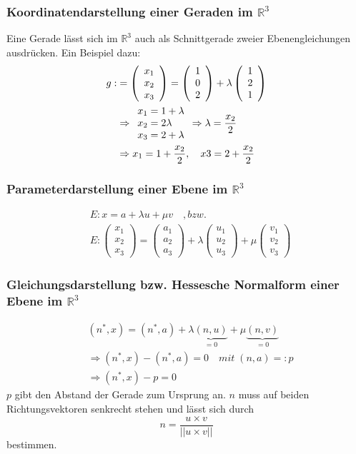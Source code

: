 \documentclass[12pt,a4paper]{article}%
\numberwithin{equation}{section}
\newcommand{\R}{\mathbb{R}} %
\def\vecT#1{\left(\begin{array}{c} #1 \end{array}\right)}
\numberwithin{equation}{subsection}
\begin{document}
    \subsubsection{Koordinatendarstellung einer Geraden im $\R^3$}
    Eine Gerade lässt sich im $\R^3$ auch als Schnittgerade zweier Ebenengleichungen ausdrücken. Ein Beispiel dazu:
    \begin{align*}
      g: &= \vecT{x_1 \\ x_2 \\ x_3} = \vecT{1 \\ 0 \\ 2} + \lambda \vecT{1\\2\\1} \\
      &\Rightarrow
      \begin{array}{l l l}
        x_1 = 1 + \lambda \\
        x_2 = 2\lambda \\
        x_3 = 2 + \lambda
      \end{array}
      \Rightarrow \lambda = \frac{x_2}{2}\\
      &\Rightarrow x_1 = 1 + \frac{x_2}{2},\quad x3 = 2 + \frac{x_2}{2}
    \end{align*}
    \subsubsection{Parameterdarstellung einer Ebene im $\R^3$}
    \begin{align}
      &E: x = a + \lambda u + \mu v \quad ,bzw. \nonumber \\
      &E: \vecT{x_1 \\ x_2 \\ x_3} = \vecT{a_1 \\ a_2 \\ a_3} + \lambda \vecT{u_1 \\ u_2 \\ u_3} + \mu \vecT{v_1 \\ v_2 \\ v_3}
    \end{align}        
    \subsubsection{Gleichungsdarstellung bzw. Hessesche Normalform einer Ebene im $\R^3$}
    \begin{align}
    &(n^*,x) = (n^*,a) + \lambda \underbrace{(n,u)}_{=0} + \mu \underbrace{(n,v)}_{=0} \nonumber \\
    &\Rightarrow (n^*,x) - (n^*,a) = 0 \quad mit \; (n,a) =: p \nonumber \\
    &\Rightarrow (n^*,x) - p = 0
    \end{align}
    $p$ gibt den Abstand der Gerade zum Ursprung an. $n$ muss auf beiden Richtungsvektoren  senkrecht stehen und lässt sich durch
    \begin{equation}
      n = \frac{u \times v}{|| u \times v||}
    \end{equation}
    bestimmen.
  
\end{document}
